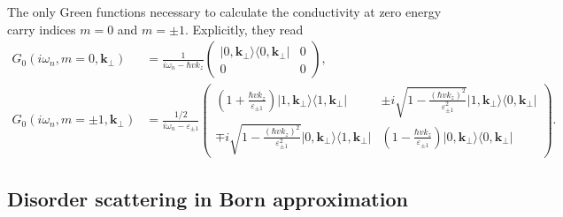 \documentclass[aps,prb,10pt,amsmath,amssymb,twocolumn,floatfix,superscriptaddress,showpacs,numerical,footinbib]{revtex4-1}
\newcommand{\ket}[1]{| #1 \rangle}
\newcommand{\bra}[1]{\langle #1 |}
\begin{document}
\begin{widetext}
\begin{equation}
\end{equation}
%
The only Green functions necessary to calculate the conductivity at zero energy carry indices $m=0$ and $m=\pm 1$. Explicitly, they read
%
\begin{align}
G_0 \left( i \omega_n ,m=0, \mathbf{k}_\perp \right)
&= \frac{1}{i\omega_{n}-\hbar v k_z}
\begin{pmatrix}
 \ket{0,\mathbf{k}_\perp} \bra{0,\mathbf{k}_\perp} & 0 \\
 0 & 0
\end{pmatrix}, \label{eq:G0} \\
G_0 \left( i \omega_n ,m=\pm 1, \mathbf{k}_\perp \right)
&= \frac{1/2}{i\omega_{n} - \varepsilon_{\pm1}}
\begin{pmatrix}
 \left( 1 + \frac{\hbar v k_z}{\varepsilon_{\pm1}} \right) \ket{1,\mathbf{k}_\perp} \bra{1,\mathbf{k}_\perp} & \pm i \sqrt{ 1- \frac{(\hbar v k_z)^2}{\varepsilon_{\pm1}^2} }\ket{1,\mathbf{k}_\perp} \bra{0,\mathbf{k}_\perp} \\
\mp i \sqrt{ 1- \frac{(\hbar v k_z)^2}{\varepsilon_{\pm1}^2} } \ket{0,\mathbf{k}_\perp} \bra{1,\mathbf{k}_\perp} &   \left( 1 - \frac{\hbar v k_z}{\varepsilon_{\pm1}} \right)   \ket{0,\mathbf{k}_\perp} \bra{0,\mathbf{k}_\perp}
\end{pmatrix} .
\end{align}

\subsection{Disorder scattering in Born approximation}


\end{widetext}
\end{document}

